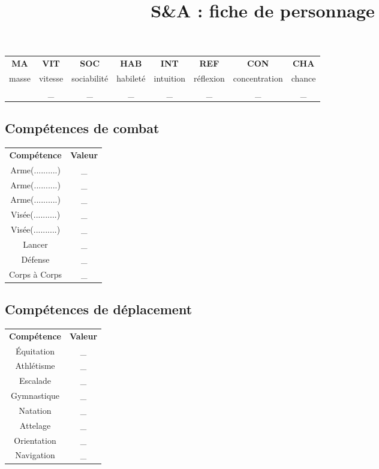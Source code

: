\documentclass[10pt,a4paper]{article}
\author{}
\title{S\&A : fiche de personnage}
\date{}
\begin{document}
\centering
\begin{tabular}{cccccccc}

\textbf{MA} & \textbf{VIT} & \textbf{SOC} & \textbf{HAB} & \textbf{INT} & \textbf{REF} & \textbf{CON} & \textbf{CHA}\\
\small
masse & \small vitesse &\small sociabilité &\small habileté &\small intuition &\small réflexion &\small concentration &\small chance \\
& \_ &\_ &\_ &\_ &\_ &\_ &\_ \\
\end{tabular}

\begin{multicols}{3}
  \subsection*{Compétences de combat}
  \begin{tabular}{cc}
  \textbf{Compétence}& \textbf{Valeur}\\
  Arme(..........) & \_\\
  Arme(..........)& \_\\
  Arme(..........)& \_\\
  Visée(..........)& \_\\
  Visée(..........)& \_\\
  Lancer& \_\\
  Défense& \_\\
  Corps à Corps& \_\\
  \end{tabular}
  \subsection*{Compétences de déplacement}
  \begin{tabular}{cc}
  \textbf{Compétence}& \textbf{Valeur}\\
  \'Equitation& \_\\
  Athlétisme& \_\\
  Escalade& \_\\
  Gymnastique& \_\\
  Natation& \_\\
  Attelage& \_\\
  Orientation& \_\\
  Navigation& \_\\
  \end{tabular}

\end{multicols}
\end{document}

